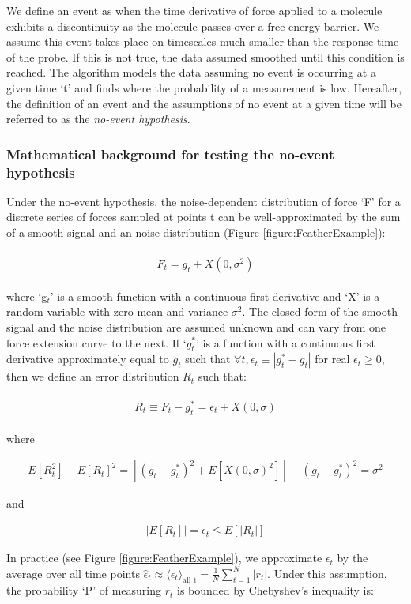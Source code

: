 \documentclass[%
  aip,12pt,tightenlines,
  amsthm,
 amsmath,amssymb
]{article}
\newcommand{\eqs}[1]{
\begin{align*} 
\begin{split}
#1
\end{split}					
\end{align*}}
\newcommand{\eqlab}[2]{
\begin{equation}
\label{equation:#2}
\begin{split}
#1
\end{split}
\end{equation}
}
\newcommand{\fRef}[1]{Figure \ref{figure:#1}}
\newcommand{\firstp}[0]{}
\newcommand{\pl}[0]{\vspace{6pt}}
\begin{document}
\firstp We define an event as when the time derivative of force applied to a molecule exhibits a discontinuity as the molecule passes over a free-energy barrier. We assume this event takes place on timescales much smaller than the response time of the probe. If this is not true, the data assumed smoothed until this condition is reached. The algorithm models the data assuming no event is occurring at a given time `t' and finds where the probability of a measurement is low. Hereafter, the definition of an event and the assumptions of no event at a given time will be referred to as the \emph{no-event hypothesis}. 

\subsubsection{Mathematical background for testing the no-event hypothesis}

\firstp Under the no-event hypothesis, the noise-dependent distribution of force `F' for a discrete series of forces sampled at points t can be well-approximated by the sum of a smooth signal and an noise distribution (\fRef{FeatherExample}):

\eqs{ F_t = g_t + X(0,\sigma^2) }

where `g$_t$' is a smooth function with a continuous first derivative and `X' is a random variable with zero mean and variance $\sigma^2$. The closed form of the smooth signal and the noise distribution are assumed unknown and can vary from one force extension curve to the next. If `$g^{*}_t$' is a function with a continuous first derivative approximately equal to $g_t$ such that $\forall t,\epsilon_t\equiv|g^{*}_t-g_t|$ for real $\epsilon_t\ge 0$, then we define an error distribution $R_t$ such that: \pl

\eqs{ R_t \equiv F_t - g^{*}_t = \epsilon_t + X(0,\sigma) }

where

\eqlab{ E[R_t^2] -E[R_t]^2 = [(g_t-g^{*}_t)^2 + E[X(0,\sigma)^2]] - (g_t-g^{*}_t)^2  = \sigma^2 }{feather-sigma}

and 

\eqlab{ |E[R_t]| = \epsilon_t \le E[|R_t|] }{feather-epsilon}

In practice (see \fRef{FeatherExample}), we approximate $\epsilon_t$ by the average over all time points $\hat{\epsilon}_t \approx \langle \epsilon_t \rangle_{\text{all t}} = \frac{1}{N} \sum_{t=1}^N |r_t|$. Under this assumption, the probability `P' of measuring $r_t$ is bounded by Chebyshev's inequality is:
\end{document}

